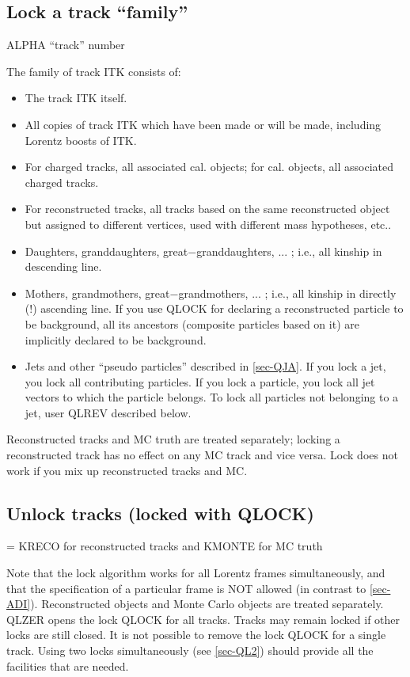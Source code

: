\subsection{\label{sec-QLO}Lock a track ``family''}
\par
{}
\par
\par
\begin{indentlist}{ 3.25cm}{ 3.50cm}
ALPHA ``track'' number
\end{indentlist}
The family of track ITK consists of:
\begin{itemize}
\item The track ITK itself.
\item All copies of track ITK which have been made or will be made,
including Lorentz boosts of ITK.
\item For charged tracks, all associated cal. objects; for cal. objects,
all associated charged tracks.
\item For reconstructed tracks, all tracks based on the same reconstructed
object but assigned to different vertices, used with different mass
hypotheses, etc..
\item Daughters, granddaughters, great$-$granddaughters, ... ; i.e.,
all
kinship in
descending line.
\item Mothers, grandmothers, great$-$grandmothers, ... ; i.e., all
kinship in
directly (!) ascending line. If you use QLOCK for declaring a
reconstructed particle to be background, all its ancestors (composite
particles based on it) are implicitly declared to be background.
\item Jets and other ``pseudo particles'' described in
\ref{sec-QJA}. If you lock a
jet, you lock all contributing particles. If you lock a particle,
you
lock all jet vectors to which the particle belongs.
To lock all particles not belonging to a jet, user QLREV described
below.
\end{itemize}
Reconstructed tracks and MC truth are treated separately;
locking a reconstructed track has no effect on any MC track and vice
versa. Lock does not work if you mix up reconstructed tracks and MC.
 
\subsection{\label{sec-QLZ}Unlock tracks (locked with QLOCK)}
\par
{}
\par
\begin{indentlist}{ 3.25cm}{ 3.50cm}
= KRECO for reconstructed tracks and
KMONTE for MC truth
\end{indentlist}
Note that
the lock algorithm works for all Lorentz frames simultaneously, and
that
the specification of a particular frame is NOT allowed (in contrast
to \ref{sec-ADI}). Reconstructed objects and Monte Carlo objects
are treated separately.
QLZER opens the lock QLOCK for all tracks. Tracks may remain locked
if
other locks are still closed.
It is not possible to remove the lock QLOCK for a single track.
Using two locks
simultaneously (see \ref{sec-QL2}) should provide
all the facilities that are needed.
 
